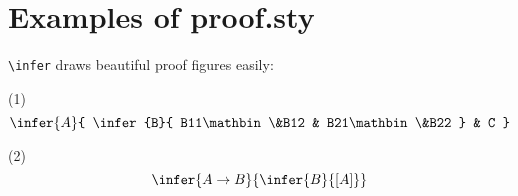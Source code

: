 %
%

\def\imp{\to}
\def\land{\mathbin\&}




\section*{Examples of proof.sty}

\verb|\infer| draws beautiful proof figures easily:

\noindent (1)
$$
\infer{A}{
	\infer{B}{
		B11\land B12
		&
		B21\land B22
	}
	&
	C
}
$$

\noindent (2)
$$
\infer{A \imp B}{
	\infer{B}{[A]}
}
$$


